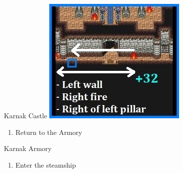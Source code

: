 \begin{paracol}{2}
\switchcolumn
\begin{steproute}{Karnak Castle}
    \includegraphics[scale=0.452]{../Graphics/Steps/36. Karnak 5.jpg}
\end{steproute}

\switchcolumn
\resume
\begin{enumerate}[resume]
    \item Return to the Armory
\end{enumerate}

\begin{shop}{Karnak Armory}
    \varwb
    \begin{buy}
        \item {} \iceRod \space {}
    \end{buy}
    \varwe
\end{shop}

\begin{enumerate}[resume]
    \item Enter the steamship
\end{enumerate}

\end{paracol}